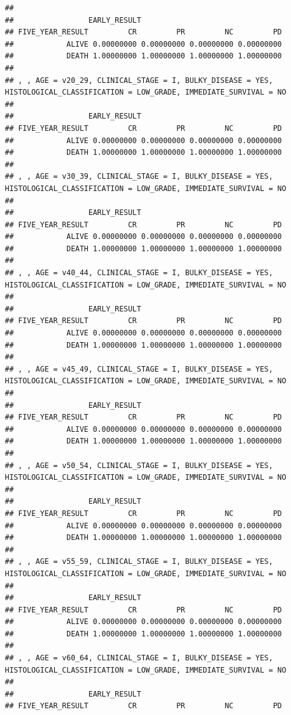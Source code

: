 \documentclass[]{article}
\begin{document}
\begin{verbatim}
## 
##                 EARLY_RESULT
## FIVE_YEAR_RESULT         CR         PR         NC         PD
##            ALIVE 0.00000000 0.00000000 0.00000000 0.00000000
##            DEATH 1.00000000 1.00000000 1.00000000 1.00000000
## 
## , , AGE = v20_29, CLINICAL_STAGE = I, BULKY_DISEASE = YES, HISTOLOGICAL_CLASSIFICATION = LOW_GRADE, IMMEDIATE_SURVIVAL = NO
## 
##                 EARLY_RESULT
## FIVE_YEAR_RESULT         CR         PR         NC         PD
##            ALIVE 0.00000000 0.00000000 0.00000000 0.00000000
##            DEATH 1.00000000 1.00000000 1.00000000 1.00000000
## 
## , , AGE = v30_39, CLINICAL_STAGE = I, BULKY_DISEASE = YES, HISTOLOGICAL_CLASSIFICATION = LOW_GRADE, IMMEDIATE_SURVIVAL = NO
## 
##                 EARLY_RESULT
## FIVE_YEAR_RESULT         CR         PR         NC         PD
##            ALIVE 0.00000000 0.00000000 0.00000000 0.00000000
##            DEATH 1.00000000 1.00000000 1.00000000 1.00000000
## 
## , , AGE = v40_44, CLINICAL_STAGE = I, BULKY_DISEASE = YES, HISTOLOGICAL_CLASSIFICATION = LOW_GRADE, IMMEDIATE_SURVIVAL = NO
## 
##                 EARLY_RESULT
## FIVE_YEAR_RESULT         CR         PR         NC         PD
##            ALIVE 0.00000000 0.00000000 0.00000000 0.00000000
##            DEATH 1.00000000 1.00000000 1.00000000 1.00000000
## 
## , , AGE = v45_49, CLINICAL_STAGE = I, BULKY_DISEASE = YES, HISTOLOGICAL_CLASSIFICATION = LOW_GRADE, IMMEDIATE_SURVIVAL = NO
## 
##                 EARLY_RESULT
## FIVE_YEAR_RESULT         CR         PR         NC         PD
##            ALIVE 0.00000000 0.00000000 0.00000000 0.00000000
##            DEATH 1.00000000 1.00000000 1.00000000 1.00000000
## 
## , , AGE = v50_54, CLINICAL_STAGE = I, BULKY_DISEASE = YES, HISTOLOGICAL_CLASSIFICATION = LOW_GRADE, IMMEDIATE_SURVIVAL = NO
## 
##                 EARLY_RESULT
## FIVE_YEAR_RESULT         CR         PR         NC         PD
##            ALIVE 0.00000000 0.00000000 0.00000000 0.00000000
##            DEATH 1.00000000 1.00000000 1.00000000 1.00000000
## 
## , , AGE = v55_59, CLINICAL_STAGE = I, BULKY_DISEASE = YES, HISTOLOGICAL_CLASSIFICATION = LOW_GRADE, IMMEDIATE_SURVIVAL = NO
## 
##                 EARLY_RESULT
## FIVE_YEAR_RESULT         CR         PR         NC         PD
##            ALIVE 0.00000000 0.00000000 0.00000000 0.00000000
##            DEATH 1.00000000 1.00000000 1.00000000 1.00000000
## 
## , , AGE = v60_64, CLINICAL_STAGE = I, BULKY_DISEASE = YES, HISTOLOGICAL_CLASSIFICATION = LOW_GRADE, IMMEDIATE_SURVIVAL = NO
## 
##                 EARLY_RESULT
## FIVE_YEAR_RESULT         CR         PR         NC         PD

\end{verbatim}
\end{document}

